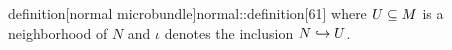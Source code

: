
\begin{mystatement}{definition}[normal
microbundle]{normal::definition}[61]
where $U \subseteq{} M$ is a neighborhood of $N$ and $\iota$ denotes the inclusion $N \hookrightarrow{} U$.
\end{mystatement}